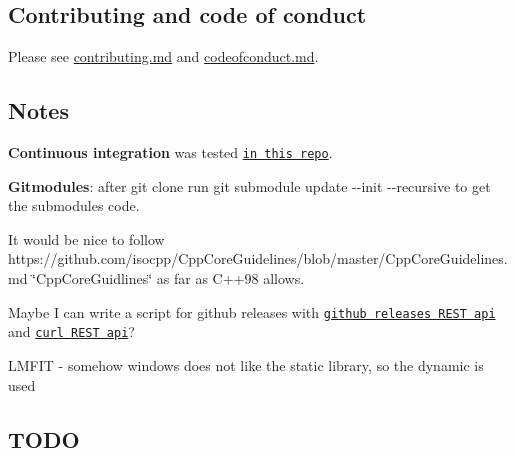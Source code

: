 \subsection*{Contributing and code of conduct}

Please see \hyperlink{md_contributing}{contributing.md} and \hyperlink{md_codeofconduct}{codeofconduct.md}.

\subsection*{Notes}


\begin{DoxyItemize}
\item {\bfseries Continuous integration} was tested \href{https://github.com/MRKonrad/ContinousIntegrationPlayground}{\tt in this repo}.
\item {\bfseries Gitmodules}\-: after {\ttfamily git clone} run {\ttfamily git submodule update -\/-\/init -\/-\/recursive} to get the submodules code.
\item It would be nice to follow https\-://github.com/isocpp/\-Cpp\-Core\-Guidelines/blob/master/\-Cpp\-Core\-Guidelines.\-md \char`\"{}\-Cpp\-Core\-Guidlines\char`\"{} as far as C++98 allows.
\item Maybe I can write a script for github releases with \href{https://developer.github.com/v3/repos/releases/#create-a-release}{\tt github releases R\-E\-S\-T api} and \href{http://www.codingpedia.org/ama/how-to-test-a-rest-api-from-command-line-with-curl/#12_HEAD_requests}{\tt curl R\-E\-S\-T api}?
\item L\-M\-F\-I\-T -\/ somehow windows does not like the static library, so the dynamic is used
\end{DoxyItemize}

\subsection*{T\-O\-D\-O}



